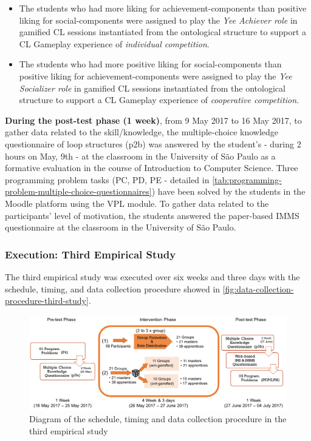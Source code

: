 \begin{itemize}
\item The students who had more liking for achievement-components than positive liking for social-components were assigned to play the \emph{Yee Achiever role} in gamified CL sessions instantiated from the ontological structure  to support a CL Gameplay experience of \emph{individual competition}.
\item The students who had more positive liking for social-components than positive liking for achievement-components were assigned to play the \emph{Yee Socializer role} in gamified CL sessions instantiated from the ontological structure  to support a CL Gameplay experience of \emph{cooperative competition}.
\end{itemize}

\textbf{During the post-test phase (1 week)}, from 9 May 2017 to 16 May 2017, to gather data related to the skill/knowledge, the multiple-choice knowledge questionnaire of loop structures (p2b) was answered by the student’s - during 2 hours on May, 9th - at the classroom in the University of São Paulo as a formative evaluation in the course of Introduction to Computer Science. 
Three programming problem tasks (PC, PD, PE - detailed in \autoref{tab:programming-problem-multiple-choice-questionnaires}) have been solved by the students in the Moodle platform using the VPL module.
To gather data related to the participants' level of motivation, the students answered the paper-based IMMS questionnaire at the classroom in the University of São Paulo.

\subsubsection{Execution: Third Empirical Study}

The third empirical study was executed over six weeks and three days with the schedule, timing, and data collection procedure showed in \autoref{fig:data-collection-procedure-third-study}.

\begin{figure}[htb]
 \caption{Diagram of the schedule, timing and data collection procedure in the third empirical study}
 \label{fig:data-collection-procedure-third-study}
 \centering
 \includegraphics[width=1\textwidth]{images/chap-evaluation/data-collection-procedure-third-study.png}
 \fautor
\end{figure}


